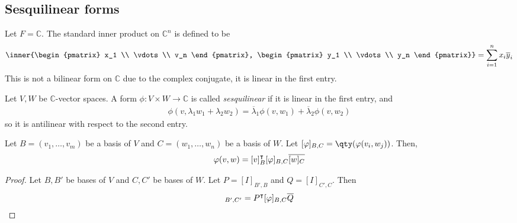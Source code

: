 \subsection{Sesquilinear forms}
Let $F = \mathbb C$.
The standard inner product on $\mathbb C^n$ is defined to be
\begin{align*}
	\inner{\begin{pmatrix} x_1 \\ \vdots \\ v_n \end{pmatrix}, \begin{pmatrix} y_1 \\ \vdots \\ y_n \end{pmatrix}} = \sum_{i=1}^n x_i \overline y_i
\end{align*}
This is not a bilinear form on $\mathbb C$ due to the complex conjugate, it is linear in the first entry.
\begin{definition}
	Let $V, W$ be $\mathbb C$-vector spaces.
	A form $\phi \colon V \times W \to \mathbb C$ is called \textit{sesquilinear} if it is linear in the first entry, and
	\begin{align*}
		\phi(v, \lambda_1 w_1 + \lambda_2 w_2) = \overline \lambda_1 \phi(v,w_1) + \overline \lambda_2 \phi(v,w_2)
	\end{align*}
	so it is antilinear with respect to the second entry.
\end{definition}
\begin{lemma}
	Let $B = (v_1, \dots, v_m)$ be a basis of $V$ and $C = (w_1, \dots, w_n)$ be a basis of $W$.
	Let $[\phi]_{B,C} = \qty(\phi(v_i, w_j))$.
	Then,
	\begin{align*}
		\varphi(v,w) = [v]_B^\intercal [\varphi]_{B,C} \overline{[w]_C}
	\end{align*}
\end{lemma}
\begin{proof}
	Let $B, B'$ be bases of $V$ and $C, C'$ be bases of $W$.
	Let $P = [I]_{B', B}$ and $Q = [I]_{C', C}$.
	Then
	\begin{align*}
		[\phi]_{B', C'} = P^\transpose [\phi]_{B,C} \overline Q
	\end{align*}
\end{proof}


